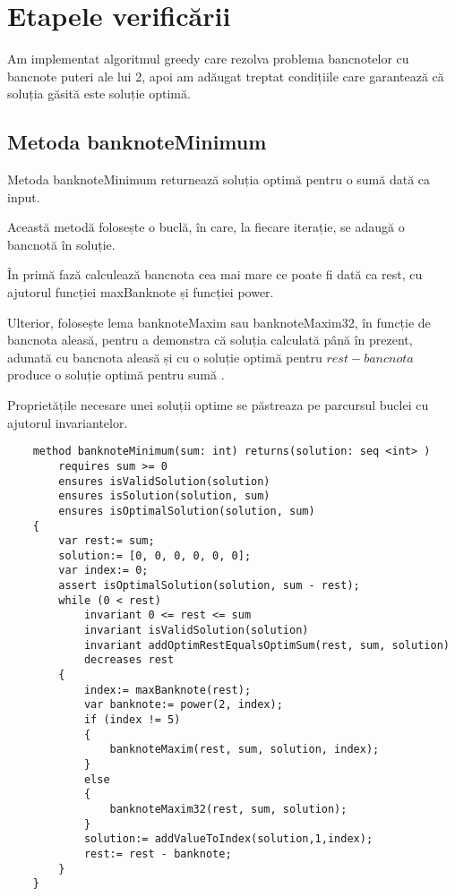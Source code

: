     
\section{Etapele verificării}
Am implementat algoritmul greedy care rezolva problema bancnotelor cu bancnote puteri ale lui 2, 
apoi am adăugat treptat condițiile care garantează că soluția găsită este soluție optimă.
    \subsection{Metoda banknoteMinimum}
    Metoda banknoteMinimum returnează soluția optimă pentru o sumă dată ca input.\par
    Această metodă folosește o buclă, în care, la fiecare iterație, se adaugă o bancnotă în soluție.\par
    În primă fază calculează bancnota cea mai mare ce poate fi dată ca rest, cu ajutorul funcției maxBanknote și funcției 
    power.\par
    Ulterior, folosește lema banknoteMaxim sau banknoteMaxim32, în funcție de bancnota aleasă, pentru a demonstra 
    că soluția calculată până în prezent, adunată cu bancnota aleasă și cu o soluție optimă pentru $rest - bancnota$ 
    produce o soluție optimă pentru sumă .\par
    Proprietățile necesare unei soluții optime se păstreaza pe parcursul buclei cu ajutorul invariantelor.\par
     
    \begin{lstlisting}
    method banknoteMinimum(sum: int) returns(solution: seq <int> )
        requires sum >= 0
        ensures isValidSolution(solution)
        ensures isSolution(solution, sum)
        ensures isOptimalSolution(solution, sum) 
    {
        var rest:= sum;
        solution:= [0, 0, 0, 0, 0, 0];
        var index:= 0;
        assert isOptimalSolution(solution, sum - rest);
        while (0 < rest)
            invariant 0 <= rest <= sum
            invariant isValidSolution(solution)
            invariant addOptimRestEqualsOptimSum(rest, sum, solution)
            decreases rest 
        {
            index:= maxBanknote(rest);
            var banknote:= power(2, index);
            if (index != 5) 
            {
                banknoteMaxim(rest, sum, solution, index);
            } 
            else 
            {
                banknoteMaxim32(rest, sum, solution);
            }
            solution:= addValueToIndex(solution,1,index);
            rest:= rest - banknote;
        }
    }
    \end{lstlisting}

